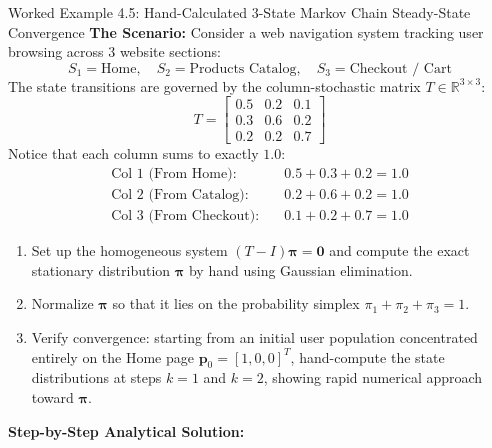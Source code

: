\begin{examplebox}{Worked Example 4.5: Hand-Calculated 3-State Markov Chain Steady-State Convergence}
\label{ex:w04_markov_convergence}
\textbf{The Scenario:}
Consider a web navigation system tracking user browsing across 3 website sections:
\begin{equation*}
S_1 = \text{Home}, \quad S_2 = \text{Products Catalog}, \quad S_3 = \text{Checkout / Cart}
\end{equation*}
The state transitions are governed by the column-stochastic matrix $T \in \mathbb{R}^{3 \times 3}$:
\begin{equation*}
T = \begin{bmatrix}
0.5 & 0.2 & 0.1 \\
0.3 & 0.6 & 0.2 \\
0.2 & 0.2 & 0.7
\end{bmatrix}
\end{equation*}
Notice that each column sums to exactly $1.0$:
\begin{align*}
\text{Col 1 (From Home):} \quad & 0.5 + 0.3 + 0.2 = 1.0 \\
\text{Col 2 (From Catalog):} \quad & 0.2 + 0.6 + 0.2 = 1.0 \\
\text{Col 3 (From Checkout):} \quad & 0.1 + 0.2 + 0.7 = 1.0
\end{align*}
\begin{enumerate}
    \item Set up the homogeneous system $(T - I)\boldsymbol{\pi} = \mathbf{0}$ and compute the exact stationary distribution $\boldsymbol{\pi}$ by hand using Gaussian elimination.
    \item Normalize $\boldsymbol{\pi}$ so that it lies on the probability simplex $\pi_1 + \pi_2 + \pi_3 = 1$.
    \item Verify convergence: starting from an initial user population concentrated entirely on the Home page $\mathbf{p}_0 = [1, 0, 0]^T$, hand-compute the state distributions at steps $k = 1$ and $k = 2$, showing rapid numerical approach toward $\boldsymbol{\pi}$.
\end{enumerate}

\tcblower
\textbf{Step-by-Step Analytical Solution:}


\end{examplebox}
